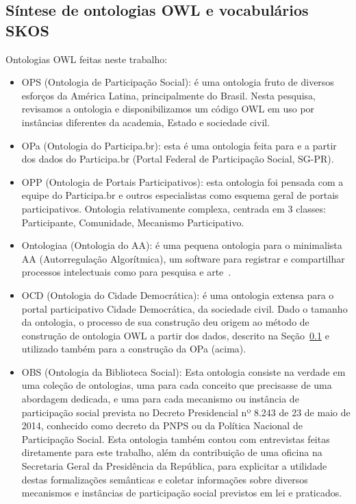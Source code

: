 \documentclass[a4paper,openright,12pt]{report} %
\begin{document}
\subsection{Síntese de ontologias OWL e vocabulários SKOS}
Ontologias OWL feitas neste trabalho:
\begin{itemize}
        \item OPS (Ontologia de Participação Social): é uma ontologia fruto de diversos esforços da América Latina, principalmente do Brasil. Nesta pesquisa, revisamos a ontologia e disponibilizamos um código OWL em uso por instâncias diferentes da academia, Estado e sociedade civil.
        \item OPa (Ontologia do Participa.br): esta é uma ontologia feita para e a partir dos dados do Participa.br (Portal Federal de Participação Social, SG-PR).
        \item OPP (Ontologia de Portais Participativos): esta ontologia foi pensada com a equipe do Participa.br e outros especialistas como esquema geral de portais participativos. Ontologia relativamente complexa, centrada em 3 classes: Participante, Comunidade, Mecanismo Participativo.
        \item Ontologiaa (Ontologia do AA): é uma pequena ontologia para o minimalista AA (Autorregulação Algorítmica), um software para registrar e compartilhar processos intelectuais como para pesquisa e arte~\cite{paaper, ensaaio}.
        \item OCD (Ontologia do Cidade Democrática): é uma ontologia extensa para o portal participativo Cidade Democrática, da sociedade civil. Dado o tamanho da ontologia, o processo de sua construção deu origem ao método de construção de ontologia OWL a partir dos dados, descrito na Seção~\ref{} e utilizado também para a construção da OPa (acima).
        \item OBS (Ontologia da Biblioteca Social): Esta ontologia consiste na verdade em uma coleção de ontologias, uma para cada conceito que precisasse de uma abordagem dedicada, e uma para cada mecanismo ou instância de participação social prevista no Decreto Presidencial nº 8.243 de 23 de maio de 2014, conhecido como decreto da PNPS ou da Política Nacional de Participação Social. Esta ontologia também contou com entrevistas feitas diretamente para este trabalho, além da contribuição de uma oficina na Secretaria Geral da
Presidência da República, para explicitar a utilidade
destas formalizações semânticas e coletar informações sobre
diversos mecanismos e instâncias de participação social previstos
em lei e praticados.
\end{itemize}
\end{document}
